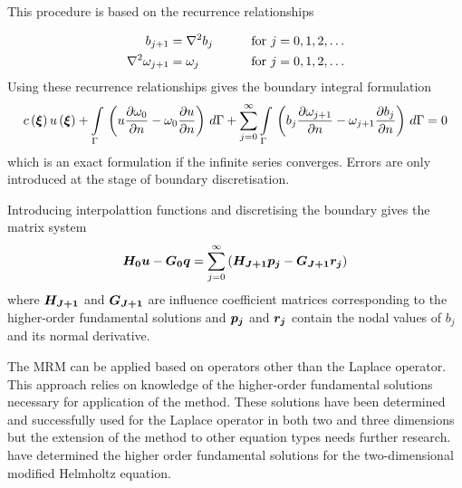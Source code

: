 This procedure is based on the recurrence relationships

\begin{alignat}{2}
  b_{j+1} & = \nabla^{2} {b_{j}} & \qquad \text{for }j &= 0,1,2,\ldots
  \label{eq:recurr} \\
  \nabla^{2} {\omega_{j+1}} & = \omega_{j} & \qquad \text{for }j &= 0,1,2,\ldots
  \label{eq:higher}
\end{alignat}
Using these recurrence relationships gives the boundary integral formulation
\begin{equation}
  \fnof{c}{\vect{\xi}} \fnof{u}{\vect{\xi}} + 
  \goneint{\pbrac{u\delby{\omega_{0}}{n} - \omega_{0} \delby{u}{n}}}{\Gamma} +
  \dsuml{j=0}{\infty}   \goneint{\pbrac{b_{j}\delby{\omega_{j+1}}{n} 
      - \omega_{j+1} \delby{b_{j}}{n}}}{\Gamma} = 0
\end{equation}
which is an exact formulation if the infinite series converges.  Errors are
only introduced at the stage of boundary discretisation.  

Introducing interpolattion functions and discretising the boundary gives
the matrix system
\begin{equation}
  \matr{H_{0}} \vect{u} - \matr{G_{0}} \vect{q} = \dsuml{j=0}{\infty}
  \pbrac{\matr{H_{j+1}} \vect{P_{j}} - \matr{G_{j+1}} \vect{R_{j}}}
\end{equation}
where $\matr{H_{j+1}}$ and $\matr{G_{j+1}}$ are influence coefficient
matrices corresponding to the higher-order fundamental solutions and
$\vect{p_{j}}$ and $\vect{r_{j}}$ contain the nodal values of $b_{j}$ and its
normal derivative. 

The MRM can be applied based on operators other than the Laplace operator.
This approach relies on knowledge of the higher-order fundamental solutions
necessary for application of the method.  These solutions have been
determined and successfully used for the Laplace operator in both two and
three dimensions but the extension of the method to other equation types
needs further research.   have determined the higher
order fundamental solutions for the two-dimensional modified Helmholtz
equation.

